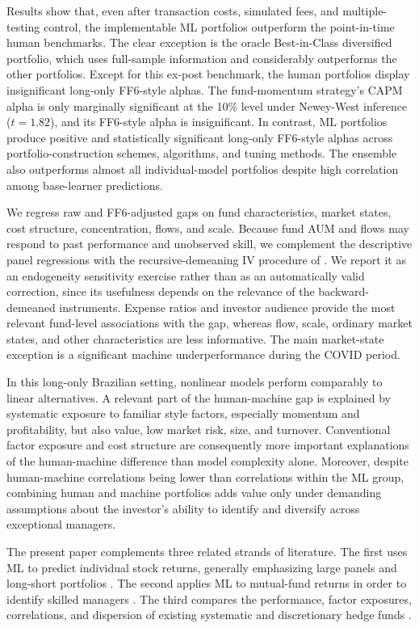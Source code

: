 \documentclass[preprint,12pt,authoryear]{elsarticle}
\begin{document}
Results show that, even after transaction costs, simulated fees, and multiple-testing control, the implementable ML portfolios outperform the point-in-time human benchmarks. The clear exception is the oracle Best-in-Class diversified portfolio, which uses full-sample information and considerably outperforms the other portfolios. Except for this ex-post benchmark, the human portfolios display insignificant long-only FF6-style alphas. The fund-momentum strategy's CAPM alpha is only marginally significant at the 10\% level under Newey-West inference ($t=1.82$), and its FF6-style alpha is insignificant. In contrast, ML portfolios produce positive and statistically significant long-only FF6-style alphas across portfolio-construction schemes, algorithms, and tuning methods. The ensemble also outperforms almost all individual-model portfolios despite high correlation among base-learner predictions.

We regress raw and FF6-adjusted gaps on fund characteristics, market states, cost structure, concentration, flows, and scale. Because fund AUM and flows may respond to past performance and unobserved skill, we complement the descriptive panel regressions with the recursive-demeaning IV procedure of \citet{pastorstambaughtaylor2015}. We report it as an endogeneity sensitivity exercise rather than as an automatically valid correction, since its usefulness depends on the relevance of the backward-demeaned instruments. Expense ratios and investor audience provide the most relevant fund-level associations with the gap, whereas flow, scale, ordinary market states, and other characteristics are less informative. The main market-state exception is a significant machine underperformance during the COVID period.

In this long-only Brazilian setting, nonlinear models perform comparably to linear alternatives. A relevant part of the human-machine gap is explained by systematic exposure to familiar style factors, especially momentum and profitability, but also value, low market risk, size, and turnover. Conventional factor exposure and cost structure are consequently more important explanations of the human-machine difference than model complexity alone. Moreover, despite human-machine correlations being lower than correlations within the ML group, combining human and machine portfolios adds value only under demanding assumptions about the investor's ability to identify and diversify across exceptional managers.

The present paper complements three related strands of literature. The first uses ML to predict individual stock returns, generally emphasizing large panels and long-short portfolios \citep{gukellyxiu2020, hanauerkalsbach2023}. The second applies ML to mutual-fund returns in order to identify skilled managers \citep{demiguel2023machine, kaniel2023machine}. The third compares the performance, factor exposures, correlations, and dispersion of existing systematic and discretionary hedge funds \citep{harveyrattraysinclairvanhemert2017}.
\end{document}

